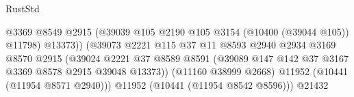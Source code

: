 \begin{lexlean}{RustStd}
\begin{coremodule}
                                                      @3369
                                                      @8549
                                                      @2915
                                                      (@39039
                                                        @105
                                                        @2190
                                                        @105
                                                        @3154
                                                        (@10400 (@39044 @105))
                                                        @11798)
                                                      @13373))
                                                  (@39073
                                                    @2221
                                                    @115
                                                    @37
                                                    @11
                                                    @8593
                                                    @2940
                                                    @2934
                                                    @3169
                                                    @8570
                                                    @2915
                                                    (@39024
                                                      @2221
                                                      @37
                                                      @8589
                                                      @8591
                                                      (@39089
                                                        @147
                                                        @142
                                                        @37
                                                        @3167
                                                        @3369
                                                        @8578
                                                        @2915
                                                        @39048
                                                        @13373))
                                                    (@11160 @38999 @2668)
                                                    @11952
                                                    (@10441 (@11954 @8571 @2940)))
                                                  @11952
                                                  (@10441 (@11954 @8542 @8596)))
                                                @21432

\end{coremodule}
\end{lexlean}
